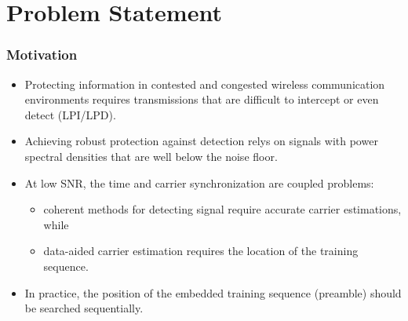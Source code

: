 \section{Problem Statement}


\begin{frame}
  \frametitle{Motivation}
  \begin{itemize}
    \item Protecting information in contested and congested wireless communication environments requires transmissions that are difficult to intercept or even detect (LPI/LPD). 
     \item Achieving robust protection against detection relys on signals with power spectral densities that are well below the noise floor. 
     \item At low SNR, the time and carrier synchronization are coupled problems:
     \begin{itemize}
      \item coherent methods for detecting signal require accurate carrier estimations, while
      \item data-aided carrier estimation requires the location of the training sequence.
     \end{itemize}
     \item In practice, the position of the embedded training sequence (preamble) should be searched sequentially.
 
 \end{itemize}
\end{frame}






